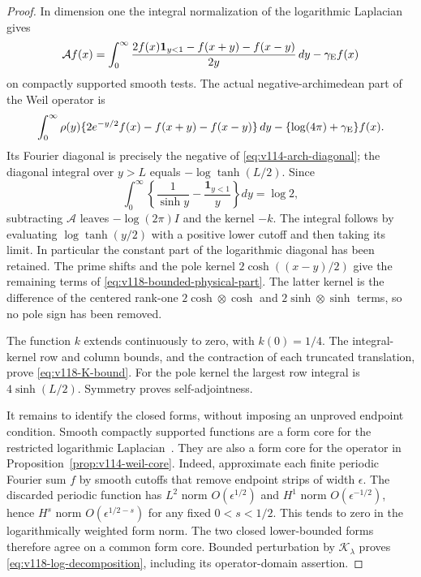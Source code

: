\begin{proof}
In dimension one the integral normalization of the logarithmic
Laplacian~\cite[Theorem~1.1]{ChenWethLog} gives
\[
 \mathcal A f(x)=\int_0^\infty
 \frac{2f(x)\mathbf1_{y<1}-f(x+y)-f(x-y)}{2y}\,dy
                   -\gamma_{\rm E}f(x)
\]
on compactly supported smooth tests.  The actual negative-archimedean
part of the Weil operator is
\[
 \int_0^\infty\rho(y)
 \{2e^{-y/2}f(x)-f(x+y)-f(x-y)\}\,dy
             -\{\log(4\pi)+\gamma_{\rm E}\}f(x).
\]
Its Fourier diagonal is precisely the negative of
\eqref{eq:v114-arch-diagonal}; the diagonal integral over $y>L$
equals $-\log\tanh(L/2)$.  Since
\[
 \int_0^\infty\left\{\frac1{\sinh y}
                -\frac{\mathbf1_{y<1}}y\right\}dy=\log2,
\]
subtracting $\mathcal A$ leaves $-\log(2\pi)I$ and the kernel $-k$.
The integral follows by evaluating $\log\tanh(y/2)$ with a positive
lower cutoff and then taking its limit.  In particular the constant
part of the logarithmic diagonal has been retained.
The prime shifts and the pole kernel $2\cosh((x-y)/2)$ give the
remaining terms of \eqref{eq:v118-bounded-physical-part}.
The latter kernel is the difference of the centered rank-one
$2\cosh\otimes\cosh$ and $2\sinh\otimes\sinh$ terms, so no pole
sign has been removed.

The function $k$ extends continuously to zero, with $k(0)=1/4$.
The integral-kernel row and column bounds, and the contraction of
each truncated translation, prove \eqref{eq:v118-K-bound}.
For the pole kernel the largest row integral is
$4\sinh(L/2)$.  Symmetry proves self-adjointness.

It remains to identify the closed forms, without imposing an
unproved endpoint condition.  Smooth compactly supported functions
are a form core for the restricted logarithmic
Laplacian~\cite[Theorem~3.1]{ChenWethLog}.  They are also a form core
for the operator in Proposition~\ref{prop:v114-weil-core}.
Indeed, approximate each finite periodic Fourier sum $f$ by smooth
cutoffs that remove endpoint strips of width $\epsilon$.
The discarded periodic function has $L^2$ norm $O(\epsilon^{1/2})$
and $H^1$ norm $O(\epsilon^{-1/2})$, hence $H^s$ norm
$O(\epsilon^{1/2-s})$ for any fixed $0<s<1/2$.
This tends to zero in the logarithmically weighted form norm.
The two closed lower-bounded forms therefore agree on a common form
core.  Bounded perturbation by $\mathcal K_\lambda$ proves
\eqref{eq:v118-log-decomposition}, including its operator-domain assertion.
\end{proof}

